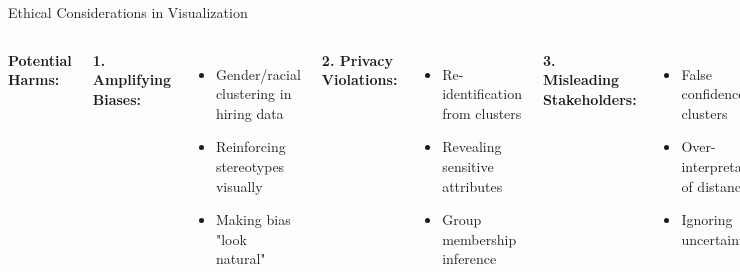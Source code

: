 \documentclass[aspectratio=169]{beamer}
\begin{document}
\begin{frame}{Ethical Considerations in Visualization}
\begin{columns}
\textbf{Potential Harms:}

\textbf{1. Amplifying Biases:}
\begin{itemize}
\item Gender/racial clustering in hiring data
\item Reinforcing stereotypes visually
\item Making bias "look natural"
\end{itemize}

\textbf{2. Privacy Violations:}
\begin{itemize}
\item Re-identification from clusters
\item Revealing sensitive attributes
\item Group membership inference
\end{itemize}

\textbf{3. Misleading Stakeholders:}
\begin{itemize}
\item False confidence in clusters
\item Over-interpretation of distances
\item Ignoring uncertainty
\end{itemize}

\textbf{4. Automated Discrimination:}
\begin{itemize}
\item Outlier-based exclusion
\item Cluster-based treatment
\item Proxy discrimination
\end{itemize}

\textbf{Mitigation Strategies:}

\textbf{Bias Auditing:}
\begin{itemize}
\item Check for protected attribute separation
\item Measure fairness metrics
\item Test on diverse subgroups
\item Document disparities
\end{itemize}

\textbf{Privacy Protection:}
\begin{itemize}
\item Differential privacy (add noise)
\item Aggregate visualizations only
\item Remove outliers in public displays
\item Access controls
\end{itemize}


\end{columns}
\end{frame}
\end{document}
